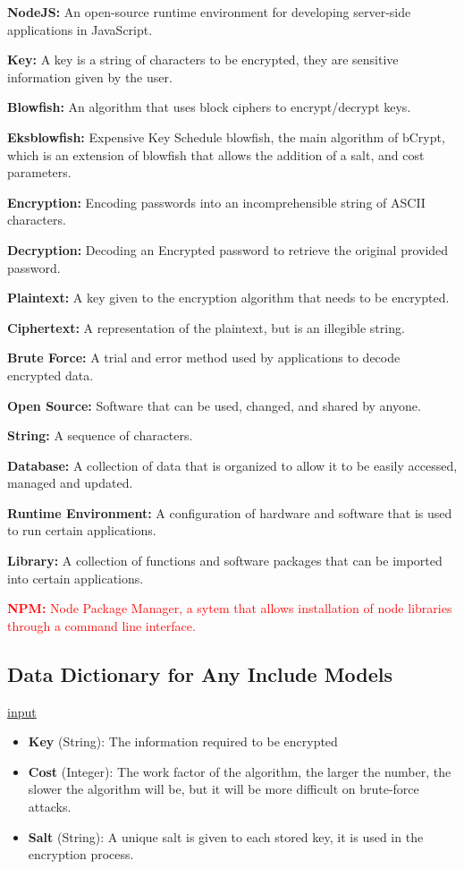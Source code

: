 \documentclass[12pt]{article}
\begin{document}
\begin{itemize}
  \item \textbf{NodeJS:} An open-source runtime environment for developing server-side applications in JavaScript. 
  \item \textbf{Key:}  A key is a string of characters to be encrypted, they are sensitive information given by the user.
  \item \textbf{Blowfish:} An algorithm that uses block ciphers to encrypt/decrypt keys. 
  \item \textbf{Eksblowfish:}  Expensive Key Schedule blowfish, the main algorithm of bCrypt, which is an extension of blowfish that allows the addition of a salt, and cost parameters.  
  \item \textbf{Encryption:}  Encoding passwords into an incomprehensible string of ASCII characters. 
  \item \textbf{Decryption:} Decoding an Encrypted password to retrieve the original provided password. 
  \item \textbf{Plaintext:} A key given to the encryption algorithm that needs to be encrypted. 
  \item \textbf{Ciphertext:} A representation of the plaintext, but is an illegible string. 
  \item \textbf{Brute Force:}  A trial and error method used by applications to decode encrypted data. 
  \item \textbf{Open Source:} Software that can be used, changed, and shared by anyone. 
  \item \textbf{String:}  A sequence of characters. 
  \item \textbf{Database:}  A collection of data that is organized to allow it to be easily accessed, managed and updated. 
  \item \textbf{Runtime Environment:} A configuration of hardware and software that is used to run certain applications.
  \item \textbf{Library:}  A collection of functions and software packages that can be imported into certain applications.  
  \textcolor{red}{\item \textbf{NPM:}  Node Package Manager, a sytem that allows installation of node libraries through a command line interface.  }
\end{itemize}

\subsection{Data Dictionary for Any Include Models}
  \underline{input} 
  \begin{itemize}
    \item \textbf{Key} (String): The information required to be encrypted
    \item \textbf{Cost} (Integer): The work factor of the algorithm, the larger the number, the slower the algorithm will be, but it will be more difficult on brute-force attacks.
    \item \textbf{Salt} (String): A unique salt is given to each stored key, it is used in the encryption process.
  \end{itemize}
\end{document}
